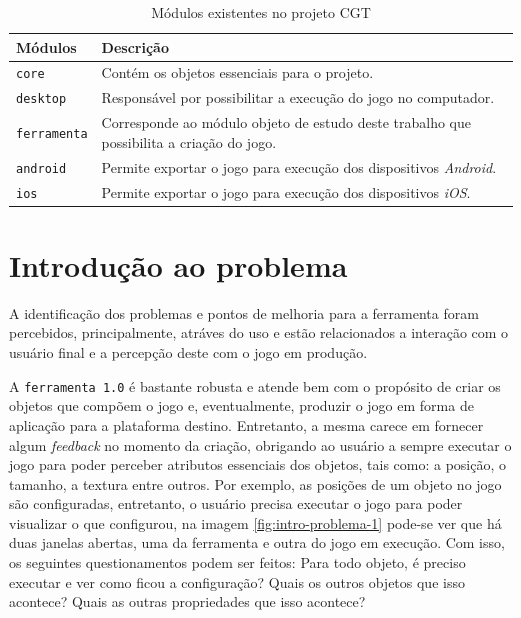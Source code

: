 \documentclass[12pt,twoside,openright,a4paper,english,brazil,sumario=tradicional]{abntex2}
\begin{document}
\begin{table}[h]
\centering
\begin{tabular}{ | l | p{10cm} | }
    \hline
    Módulos & Descrição \\ \hline
    \texttt{core} & Contém os objetos essenciais para o projeto. \\
    \texttt{desktop} & Responsável por possibilitar a execução do jogo no computador. \\
		\texttt{ferramenta} & Corresponde ao módulo objeto de estudo deste trabalho que possibilita a criação do jogo. \\
		\texttt{android} & Permite exportar o jogo para execução dos dispositivos \emph{Android}. \\
		\texttt{ios} & Permite exportar o jogo para execução dos dispositivos \emph{iOS}. \\
    \hline
\end{tabular}
\caption{Módulos existentes no projeto CGT }
\label{table:modulos}
\end{table}

\section{Introdução ao problema}
A identificação dos problemas e pontos de melhoria para a ferramenta foram percebidos, principalmente, atráves do uso e estão relacionados a interação com o usuário final e a percepção deste com o jogo em produção.

A \texttt{ferramenta 1.0} é bastante robusta e atende bem com o propósito de criar os objetos que compõem o jogo e, eventualmente, produzir o jogo em forma de aplicação para a plataforma destino. Entretanto, a mesma carece em fornecer algum \emph{feedback} no momento da criação, obrigando ao usuário a sempre executar o jogo para poder perceber atributos essenciais dos objetos, tais como: a posição, o tamanho, a textura entre outros. Por exemplo, as posições de um objeto no jogo são configuradas, entretanto, o usuário precisa executar o jogo para poder visualizar o que configurou, na imagem \ref{fig:intro-problema-1} pode-se ver que há duas janelas abertas, uma da ferramenta e outra do jogo em execução. Com isso, os seguintes questionamentos podem ser feitos: Para todo objeto, é preciso executar e ver como ficou a configuração? Quais os outros objetos que isso acontece? Quais as outras propriedades que isso acontece?
\end{document}

